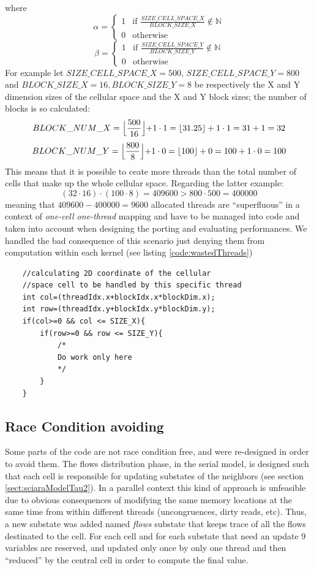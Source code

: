 where
\[
\alpha =
\begin{cases}
1 &\mbox{if } \frac{SIZE\_CELL\_SPACE\_X}{BLOCK\_SIZE\_X} \not\in \mathbb{N}  \\
0 & \mbox{otherwise }
\end{cases}
\]
\[
\beta =
\begin{cases}
1 &\mbox{if } \frac{SIZE\_CELL\_SPACE\_Y}{BLOCK\_SIZE\_Y} \not\in \mathbb{N}  \\
0 & \mbox{otherwise }
\end{cases}
\]
For example let \(SIZE\_CELL\_SPACE\_X=500\), \(SIZE\_CELL\_SPACE\_Y=800 \) and
\(BLOCK\_SIZE\_X=16,BLOCK\_SIZE\_Y=8\) be respectively the X and Y dimension
sizes of the cellular space and the X and Y block sizes; the number of blocks is
so calculated:
\[
BLOCK\_NUM\_X=\Bigl\lfloor\frac{500}{16} \Bigl\rfloor + 1 \cdot 1 =
\lfloor31.25\rfloor+1\cdot1= 31 + 1= 32\]
\[
BLOCK\_NUM\_Y=\Bigl\lfloor\frac{800}{8} \Bigl\rfloor + 1 \cdot 0
=\lfloor100\rfloor+0= 100 + 1\cdot0= 100 \]
This means that it is possible to ceate more threads
 than the total number of cells that make up the whole cellular space.
Regarding the latter example:
\[
(32\cdot 16) \cdot (100\cdot 8)=409600 > 800 \cdot 500= 400000
\]
meaning that \(409600-400000=9600\) allocated threads are ``superfluous'' in a
context of \textit{one-cell one-thread} mapping and have to be managed into code and taken
into account when designing the porting and evaluating performances.
We handled the bad consequence of this scenario just denying them from
computation within each kernel (see listing \ref{code:wastedThreads})


\begin{lstlisting}
	//calculating 2D coordinate of the cellular
	//space cell to be handled by this specific thread
	int col=(threadIdx.x+blockIdx.x*blockDim.x);
	int row=(threadIdx.y+blockIdx.y*blockDim.y);
	if(col>=0 && col <= SIZE_X){
		if(row>=0 && row <= SIZE_Y){
			/*
			Do work only here
			*/
		}
	}

\end{lstlisting}


\subsection{Race Condition avoiding}\label{sect:raceCondAvoiding}
Some parts of the code are not race condition free, and were re-designed in
order to avoid them. The flows distribution phase, in the serial model, is
designed such that each cell is responsible for updating substates of the
neighbors (see section \ref{sect:sciaraModelTau2}). In a parallel context this
kind of approach is unfeasible due to obvious consequences of modifying the same
memory locations at the same time from within different threads (uncongruences,
dirty reads, etc). Thus, a new substate was added named \textit{flows}
substate that keeps trace of all the flows destinated to the cell. For each cell
and for each substate that need an update 9 variables are reserved, and updated
only once by only one thread and then ``reduced'' by the central cell in order
to compute the final value.

